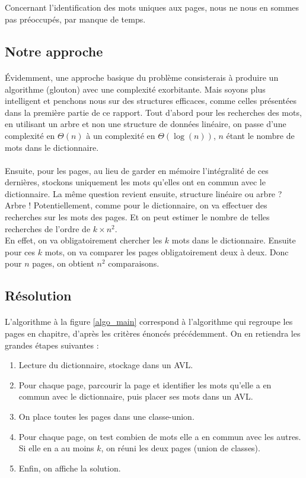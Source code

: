 \documentclass[a4paper]{article}
\begin{document}
		\subparagraph{}{
		Concernant l'identification des mots uniques aux pages, nous ne nous en sommes pas
		préoccupés, par manque de temps.
		}
	
	
		\subsection{Notre approche}
		
			\paragraph{}{
			Évidemment, une approche basique du problème consisterais à produire un algorithme (glouton) avec une complexité
			exorbitante. Mais soyons plus intelligent et penchons nous sur des structures efficaces, comme celles présentées
			dans la première partie de ce rapport. Tout d'abord pour les recherches des mots, en utilisant un arbre et non
			une structure de données linéaire, on passe d'une complexité en $\Theta(n)$ à un complexité
			en $\Theta(\log(n))$, $n$ étant le nombre de mots dans le dictionnaire.
			}
			\paragraph{}{
			Ensuite, pour les pages, au lieu de garder en mémoire l'intégralité de ces dernières, stockons 
			uniquement les mots qu'elles ont en commun avec le dictionnaire. La même question revient ensuite, structure linéaire
			ou arbre ? Arbre ! Potentiellement, comme pour le dictionnaire, on va effectuer des recherches sur les mots des pages.
			Et on peut estimer le nombre de telles recherches de l'ordre de $k \times n^{2}$. \\
			En effet, on va obligatoirement chercher les $k$ mots dans le dictionnaire. Ensuite pour ces $k$ mots, on va comparer
			les pages obligatoirement deux à deux. Donc pour $n$ pages, on obtient $n^{2}$ comparaisons.
			}

		\subsection{Résolution}
			\paragraph{}{
			L'algorithme à la figure \ref{algo_main} correspond à l'algorithme qui regroupe les
			pages en chapitre, d'après les critères énoncés précédemment. On en retiendra 
			les grandes étapes suivantes :
			\begin{enumerate}
				\item Lecture du dictionnaire, stockage dans un AVL.
				\item Pour chaque page, parcourir la page et identifier les mots qu'elle
				a en commun avec le dictionnaire, puis placer ses mots dans un AVL.
				\item On place toutes les pages dans une classe-union.
				\item Pour chaque page, on test combien de mots elle a en commun avec les autres.
				Si elle en a au moins $k$, on réuni les deux pages (union de classes).
				\item Enfin, on affiche la solution.
			\end{enumerate} 
		 	}
\end{document}
